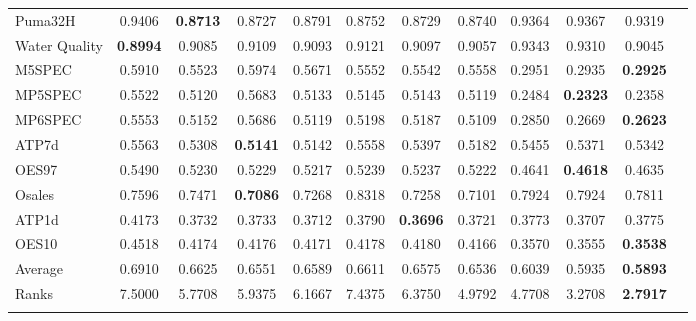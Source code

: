 \documentclass[reqno]{vcuthesis}
\numberwithin{equation}{chapter}
\begin{document}
\begin{table}[b!]
{\begin{tabular}{l@{\extracolsep{\fill}}ccccccccccc}
Puma32H &0.9406 &\textbf{0.8713} &0.8727 &0.8791 &0.8752 &0.8729 &0.8740 &0.9364 &0.9367 &0.9319   \\
Water Quality &\textbf{0.8994} &0.9085 &0.9109 &0.9093 &0.9121 &0.9097 &0.9057 &0.9343 &0.9310 &0.9045   \\
M5SPEC &0.5910 &0.5523 &0.5974 &0.5671 &0.5552 &0.5542 &0.5558 &0.2951 &0.2935 &\textbf{0.2925}   \\
MP5SPEC &0.5522 &0.5120 &0.5683 &0.5133 &0.5145 &0.5143 &0.5119 &0.2484 &\textbf{0.2323} &0.2358   \\
MP6SPEC &0.5553 &0.5152 &0.5686 &0.5119 &0.5198 &0.5187 &0.5109 &0.2850 &0.2669 &\textbf{0.2623}   \\
ATP7d &0.5563 &0.5308 &\textbf{0.5141} &0.5142 &0.5558 &0.5397 &0.5182 &0.5455 &0.5371 &0.5342   \\
OES97 &0.5490 &0.5230 &0.5229 &0.5217 &0.5239 &0.5237 &0.5222 &0.4641 &\textbf{0.4618} &0.4635   \\
Osales &0.7596 &0.7471 &\textbf{0.7086} &0.7268 &0.8318 &0.7258 &0.7101 &0.7924 &0.7924 &0.7811   \\
ATP1d &0.4173 &0.3732 &0.3733 &0.3712 &0.3790 &\textbf{0.3696} &0.3721 &0.3773 &0.3707 &0.3775   \\
OES10 &0.4518 &0.4174 &0.4176 &0.4171 &0.4178 &0.4180 &0.4166 &0.3570 &0.3555 &\textbf{0.3538}   \\
\noalign{\smallskip}\hline\noalign{\smallskip}
Average &0.6910 &0.6625 &0.6551 &0.6589 &0.6611 &0.6575 &0.6536 &0.6039 &0.5935 &\textbf{0.5893}   \\
Ranks &7.5000 &5.7708 &5.9375 &6.1667 &7.4375 &6.3750 &4.9792 &4.7708 &3.2708 &\textbf{2.7917}   \\
\noalign{\smallskip}\hline
\end{tabular}}
\centering \small
{}
\end{table}
\end{document}
